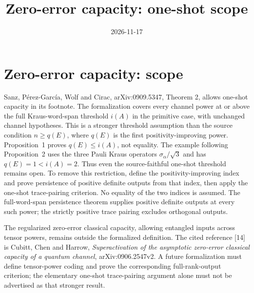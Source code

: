 \documentclass{article}
\title{Zero-error capacity: one-shot scope}
\author{}
\date{2026-11-17}
\begin{document}
\maketitle
{}

\section{Zero-error capacity: scope}
Sanz, Pérez-García, Wolf and Cirac, arXiv:0909.5347,
Theorem 2, allows one-shot capacity in its footnote. The formalization
covers every channel power at or above the full Kraus-word-span threshold
$i(A)$ in the primitive case, with unchanged channel hypotheses. This is
a stronger threshold assumption than the source condition $n\ge q(E)$,
where $q(E)$ is the first positivity-improving power. Proposition~1 proves
$q(E)\le i(A)$, not equality. The example following Proposition~2 uses
the three Pauli Kraus operators $\sigma_\alpha/\sqrt{3}$ and has
$q(E)=1<i(A)=2$. Thus even the source-faithful one-shot threshold remains open.
To remove this restriction, define the positivity-improving index and prove
persistence of positive definite outputs from that index, then apply the
one-shot trace-pairing criterion. No equality of the two indices is assumed. The full-word-span persistence theorem supplies
positive definite outputs at every such power; the strictly positive
trace pairing excludes orthogonal outputs.

The regularized zero-error classical capacity, allowing entangled inputs
across tensor powers, remains outside the formalized definition.
The cited reference [14] is Cubitt, Chen and Harrow,
\emph{Superactivation of the asymptotic zero-error classical capacity
of a quantum channel}, arXiv:0906.2547v2. A future formalization must
define tensor-power coding and prove the corresponding full-rank-output
criterion; the elementary one-shot trace-pairing argument alone must not
be advertised as that stronger result.
\end{document}
